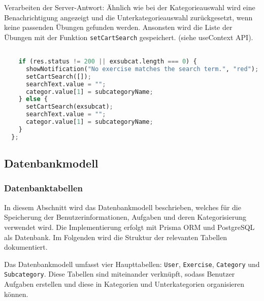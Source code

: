 \documentclass[12pt,a4paper]{scrartcl} %
\begin{document}
Verarbeiten der Server-Antwort: Ähnlich wie bei der Kategorieauswahl wird eine Benachrichtigung angezeigt und die Unterkategorieauswahl zurückgesetzt, wenn keine passenden Übungen gefunden werden. Ansonsten wird die Liste der Übungen mit der Funktion \texttt{setCartSearch} gespeichert. (siehe useContext API).


\begin{lstlisting}[language=Python]

    if (res.status != 200 || exsubcat.length === 0) {
      showNotification("No exercise matches the search term.", "red");
      setCartSearch([]);
      searchText.value = "";
      categor.value[1] = subcategoryName;
    } else {
      setCartSearch(exsubcat);
      searchText.value = "";
      categor.value[1] = subcategoryName;
    }
  };
\end{lstlisting}


\subsection{Datenbankmodell}

\subsubsection{Datenbanktabellen}

In diesem Abschnitt wird das Datenbankmodell beschrieben, welches für die Speicherung der Benutzerinformationen, Aufgaben und deren Kategorisierung verwendet wird. Die Implementierung erfolgt mit Prisma ORM und PostgreSQL als Datenbank. Im Folgenden wird die Struktur der relevanten Tabellen dokumentiert.

Das Datenbankmodell umfasst vier Haupttabellen: \texttt{User}, \texttt{Exercise}, \texttt{Category} und \texttt{Subcategory}. Diese Tabellen sind miteinander verknüpft, sodass Benutzer Aufgaben erstellen und diese in Kategorien und Unterkategorien organisieren können.
\end{document}
